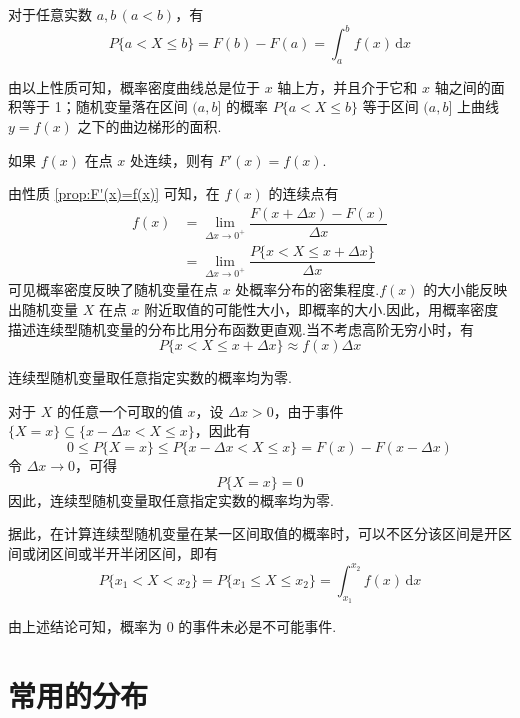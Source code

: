 \begin{property}
    对于任意实数 $a,b\,(a<b)$，有
    $$
    P\{a < X \leqslant b\}=F(b)-F(a)=\int_a^b f(x)\,\text{d}x
    $$
\end{property}

由以上性质可知，概率密度曲线总是位于 $x$ 轴上方，并且介于它和 $x$ 轴之间的面积等于 1；随机变量落在区间 $(a,b]$ 的概率 $P\{a < X \leqslant b\}$ 等于区间 $(a,b]$ 上曲线 $y=f(x)$ 之下的曲边梯形的面积.

\begin{property} \label{prop:F'(x)=f(x)}
    如果 $f(x)$ 在点 $x$ 处连续，则有 $F'(x)=f(x)$.
\end{property}

由性质 \ref*{prop:F'(x)=f(x)} 可知，在 $f(x)$ 的连续点有
$$
\begin{aligned}
    f(x) &= \lim_{\Delta x \to 0^+} \dfrac{F(x + \Delta x)-F(x)}{\Delta x}\\
    &= \lim_{\Delta x \to 0^+} \dfrac{P\{x < X \leqslant x + \Delta x\}}{\Delta x}
\end{aligned}
$$
可见概率密度反映了随机变量在点 $x$ 处概率分布的密集程度.$f(x)$ 的大小能反映出随机变量 $X$ 在点 $x$ 附近取值的可能性大小，即概率的大小.因此，用概率密度描述连续型随机变量的分布比用分布函数更直观.当不考虑高阶无穷小时，有
$$
P\{x < X \leqslant x + \Delta x\} \approx f(x) \Delta x
$$

\begin{conclusion}
    连续型随机变量取任意指定实数的概率均为零.
\end{conclusion}

\begin{myproof}
    对于 $X$ 的任意一个可取的值 $x$，设 $\Delta x > 0$，由于事件 $\{X=x\} \subseteq \{x - \Delta x < X \leqslant x\}$，因此有
    $$
    0 \leqslant P\{X=x\} \leqslant P\{x - \Delta x < X \leqslant x\} = F(x)-F(x-\Delta x)
    $$
    令 $\Delta x \to 0$，可得
    $$
    P\{X=x\}=0
    $$
    因此，连续型随机变量取任意指定实数的概率均为零.
\end{myproof}


据此，在计算连续型随机变量在某一区间取值的概率时，可以不区分该区间是开区间或闭区间或半开半闭区间，即有
$$
P\{x_1 < X < x_2\} = P\{x_1 \leqslant X \leqslant x_2\} = \int_{x_1}^{x_2} f(x)\,\text{d}x
$$

由上述结论可知，概率为 0 的事件未必是不可能事件.

\section{常用的分布}

